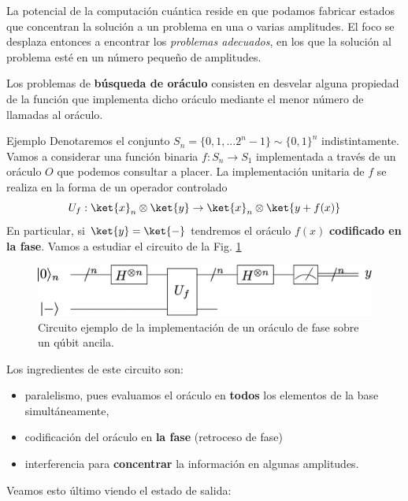 \documentclass[a4paper,11pt]{book} %
\numberwithin{equation}{chapter}
\begin{document}
La potencial de la computación cuántica reside en que podamos fabricar estados que concentran la solución a un problema en una o varias amplitudes. El foco se desplaza entonces a encontrar los \textit{problemas adecuados}, en los que la solución al problema esté en un número pequeño de amplitudes. 

Los problemas de \textbf{búsqueda de oráculo} consisten en desvelar alguna propiedad de la función que implementa dicho oráculo mediante el menor número de llamadas al oráculo. 

	\begin{mybox_green}{Ejemplo}
	Denotaremos el conjunto $S_n =\{0,1,...2^n-1 \}\sim \{0,1\}^n$ indistintamente. Vamos a considerar una función binaria  $f:S_n \to S_1$ implementada
	 a través de un oráculo $O$ que podemos consultar a placer. La implementación unitaria de $f$ se realiza en la forma de un operador controlado
	\begin{equation}
	{U_f} : \ket{x}_n\otimes \ket{y} \to \ket{x}_n\otimes \ket{y + f(x)}
	\end{equation}
	En particular, si $\ket{y} = \ket{-}$ tendremos el oráculo $f(x)$ \textbf{codificado en la fase}. Vamos a estudiar el circuito de la Fig. \ref{Fig_algoritmos_didac_Busqueda_Oraculo}
		\begin{figure}[H]
		\centering 
		\includegraphics[width=0.65\linewidth]{Figuras/Fig_algoritmos_didac_Busqueda_Oraculo.png}
		\caption{Circuito ejemplo de la implementación de un oráculo de fase sobre un qúbit ancila.}
		\label{Fig_algoritmos_didac_Busqueda_Oraculo}
		\end{figure}
		
	Los ingredientes de este circuito son:
	\begin{itemize}
		\item paralelismo, pues evaluamos el oráculo en \textbf{todos} los elementos de la base simultáneamente,
		\item codificación del oráculo en \textbf{la fase} (retroceso de fase)
		\item interferencia para \textbf{concentrar} la información en algunas amplitudes.
	\end{itemize}
    Veamos esto último viendo el estado de salida:
    

\end{mybox_green}
\end{document}
